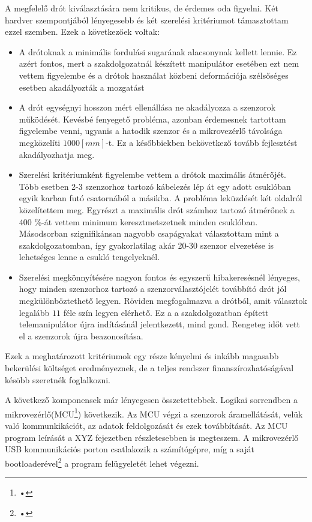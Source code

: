 A megfelelő drót kiválasztására nem kritikus, de érdemes oda figyelni. Két hardver szempontjából lényegesebb és két szerelési kritériumot támasztottam ezzel szemben. Ezek a következőek voltak:
\begin{itemize}
  \item A drótoknak a minimális fordulási sugarának alacsonynak kellett lennie. Ez azért fontos, mert a szakdolgozatnál készített manipulátor esetében ezt nem vettem figyelembe és a drótok használat közbeni deformációja szélsőséges esetben akadályozták a mozgatást
  \item A drót egységnyi hosszon mért ellenállása ne akadályozza a szenzorok működését. Kevésbé fenyegető probléma, azonban érdemesnek tartottam figyelembe venni, ugyanis a hatodik szenzor és a mikrovezérlő távolsága megközelíti $1000[mm]$-t. Ez a későbbiekben bekövetkező tovább fejlesztést akadályozhatja meg.
  \item Szerelési kritériumként figyelembe vettem a drótok maximális átmérőjét. Több esetben 2-3 szenzorhoz tartozó kábelezés lép át egy adott csuklóban egyik karban futó csatornából a másikba. A probléma leküzdését két oldalról közelítettem meg. Egyrészt a maximális drót számhoz tartozó átmérőnek a $400$ \%-át vettem minimum keresztmetszetnek minden csuklóban. Másodsorban szignifikánsan nagyobb csapágyakat választottam mint a szakdolgozatomban, így gyakorlatilag akár 20-30 szenzor elvezetése is lehetséges lenne a csukló tengelyeknél.
  \item Szerelési megkönnyítésére nagyon fontos és egyszerű hibakeresésnél lényeges, hogy minden szenzorhoz tartozó a szenzorválasztójelét továbbító drót jól megkülönböztethető legyen. Röviden megfogalmazva a drótból, amit választok legalább $11$ féle szín legyen elérhető. Ez a a szakdolgozatban épített telemanipulátor újra indításánál jelentkezett, mind gond. Rengeteg időt vett el a szenzorok újra beazonosítása.
\end{itemize}
Ezek a meghatározott kritériumok egy része kényelmi és inkább magasabb bekerülési költséget eredményeznek, de a teljes rendszer finanszírozhatóságával késöbb szeretnék foglalkozni.

A következő komponensek már lényegesen összetettebbek. Logikai sorrendben a mikrovezérlő(MCU\footnote{•}) következik. Az MCU végzi a szenzorok áramellátását, velük való kommunkikációt, az adatok feldolgozását és ezek továbbítását. Az MCU program leírását a XYZ fejezetben részletesebben is megteszem. A mikrovezérlő USB kommunikációs porton csatlakozik a számítógépre, míg a saját bootloaderével\footnote{•} a program felügyeletét lehet végezni.

